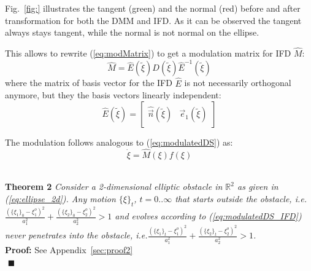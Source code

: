 Fig.~\ref{fig:} illustrates the tangent (green) and the normal (red) before and after transformation for both the DMM and IFD. As it can be observed the tangent always stays tangent, while the normal is not normal on the ellipse.

This allows to rewrite (\ref{eq:modMatrix}) to get a modulation matrix for IFD $\hat M$:
\begin{equation}
\hat M = \hat E(\tilde \xi)  D(\tilde \xi) \hat E^{-1}(\tilde \xi)\label{eq:modMatrix_IFD}
\end{equation}
where the matrix of basis vector for the IFD $\hat E$ is not necessarily orthogonal anymore, but they the basis vectors linearly independent:
\begin{equation}
  \hat E(\tilde \xi) = \begin{bmatrix} \hat{\vec n}(\tilde \xi) & \vec e_1(\tilde \xi) \end{bmatrix}
\end{equation}

The modulation follows analogous to (\ref{eq:modulatedDS}) as:
\begin{equation}
  \dot \xi = \hat{M}(\xi) f(\xi) \label{eq:modulatedDS_IFD}
\end{equation}

\\ \noindent\textbf{Theorem 2}
\textit{Consider a 2-dimensional elliptic obstacle in $\mathbb{R}^2$ as given in (\ref{eq:ellipse_2d}). Any motion $\{\xi\}_t$, $t = 0 .. \infty$ that starts outside the obstacle, i.e. $ \frac{(\{\xi_1\}_0 - \xi_1^o)^2}{a_1^2} + \frac{(\{\xi_2\}_0 - \xi_2^o)^2}{a_2^2} > 1  $ and evolves according to (\ref{eq:modulatedDS_IFD}) never penetrates into the obstacle, i.e.$ \frac{(\{\xi_1\}_t - \xi_1^o)^2}{a_1^2} + \frac{(\{\xi_2\}_t - \xi_2^o)^2}{a_2^2} > 1 $.} \\
\textbf{Proof:} See Appendix~\ref{sec:proof2} \\
${}$ \hfill $\blacksquare$


